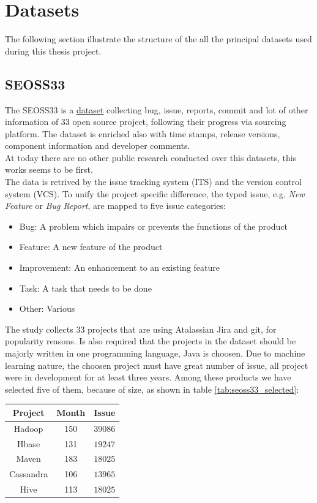 \documentclass[%
    corpo=12pt,
    twoside,
    oldstyle,
    autoretitolo,
    greek,
    evenboxes,
]{toptesi}
\begin{document}
\chapter{Datasets}
\label{chap:dataset}
The following section illustrate the structure of the all the principal datasets used during this thesis project.
\section{SEOSS33}
The SEOSS33\cite{SEOSS33} is a \href{https://doi.org/10.7910/DVN/PDDZ4Q}{dataset} collecting bug, issue, reports, commit and lot of other information of 33 open source project, following their progress via sourcing platform. The dataset is enriched also with time stamps, release versions, component information and developer comments.\\
At today there are no other public research conducted over this datasets, this works seems to be first.\\
The data is retrived by the issue tracking system (ITS) and the version control system (VCS).
To unify the project specific difference, the typed issue, e.g. \textit{New Feature} or \textit{Bug Report}, are mapped to five issue categories:
\begin{itemize}
  \item Bug: A problem which impairs or prevents the functions of the product
  \item Feature: A new feature of the product
  \item Improvement: An enhancement to an existing feature
  \item Task: A task that needs to be done
  \item Other: Various
\end{itemize}
The study collects 33 projects that are using Atalassian Jira and git, for popularity reasons. Is also required that the projects in the dataset should be majorly written in one programming language, Java is choosen. Due to machine learning nature, the choosen project must have great number of issue, all project were in development for at least three years. Among these products we have selected five of them, because of size, as shown in table \ref{tab:seoss33_selected}:

\begin{center}
   \label{tab:seoss33_selected}
  \begin{tabular}{ |c|c|c| }
     \hline
     \textbf{Project} & \textbf{Month} & \textbf{Issue} \\
     \hline
     \hline
     Hadoop & 150 & $39086$ \\
     Hbase & 131 & $19247$ \\
     Maven & 183 & $18025$ \\
     Cassandra & 106 & $13965$ \\
     Hive & 113 & $18025$ \\
     \hline
  \end{tabular}
\end{center}
\end{document}
